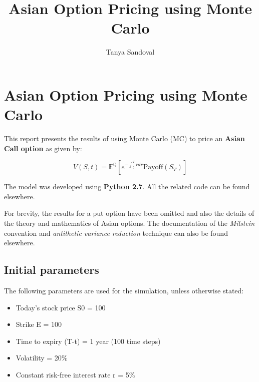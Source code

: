 \documentclass{article}
\title{Asian Option Pricing using Monte Carlo}
\author{Tanya Sandoval}
\providecommand{\tightlist}{%
      \setlength{\itemsep}{0pt}\setlength{\parskip}{0pt}}
\begin{document}
    
    
    \maketitle
    
    

    
    \section{Asian Option Pricing using Monte
Carlo}\label{asian-option-pricing-using-monte-carlo}

This report presents the results of using Monte Carlo (MC) to price an
\textbf{Asian Call option} as given by:

\begin{equation}
V(S, t) = \mathbb{E}^\mathbb{Q} [e^{-\int^T_t rdr} \mathrm{Payoff}(S_T)] 
\end{equation}

The model was developed using {\textbf{Python 2.7}}. All the related code can be found elsewhere. 

For brevity, the results for a put option have been omitted and also the details of the theory and mathematics of Asian options. The documentation of the {\it{Milstein}} convention and {\it antithetic variance reduction} technique can also be found elsewhere.

    \subsection{Initial parameters}\label{initial-parameters}

The following parameters are used for the simulation, unless otherwise
stated:

\begin{itemize}
\tightlist
\item
  Today's stock price S0 = 100
\item
  Strike E = 100
\item
  Time to expiry (T-t) = 1 year (100 time steps)
\item
  Volatility = 20\%
\item
  Constant risk-free interest rate r = 5\%
\end{itemize}
\end{document}
